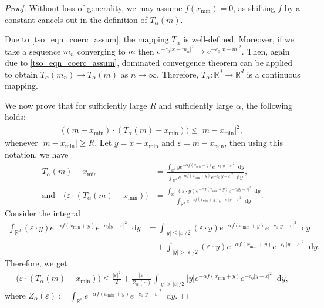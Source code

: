 \documentclass[10pt,a4paper]{amsart}
\newcommand*\der{\mathop{}\!\mathrm{d}}
\begin{document}
\begin{proof}
Without loss of generality, we may assume $f(x_{\min}) = 0$, as shifting $f$ by a constant cancels out in the definition of $T_\alpha(m)$.

Due to \eqref{tso_eqn_coerc_assum}, the mapping $T_\alpha$ is well-defined. Moreover, if we take a sequence $m_n $ converging to $m$ then $e^{-c_0 |x - m_n|^2} \to e^{-c_0 |x - m|^2}$. Then, again due to  \eqref{tso_eqn_coerc_assum}, dominated convergence theorem can be applied to obtain $T_\alpha (m_n) \to T_{\alpha}(m) $ as $n \to \infty$. Therefore, $T_\alpha :\mathbb{R}^{d} \to \mathbb{R}^d$ is a continuous mapping. 


We now prove that for sufficiently large $R$ and sufficiently large $\alpha$, the following holds:
\begin{align*}
 \big( ( m - x_{\min}) \cdot (T_\alpha(m) - x_{\min})\big) \leq |m - x_{\min}|^2, 
\end{align*}
whenever $|m - x_{\min}| \geq R$. Let $y = x - x_{\min}$ and $\varepsilon = m - x_{\min}$, then using this notation, we have
\begin{align*}
    T_{\alpha}(m) - x_{\min} &= \frac{\int_{\mathbb{R}^d} y e^{-\alpha f(x_{\min} + y)} e^{-c_0 |y - \varepsilon|^2} \der y}{\int_{\mathbb{R}^d} e^{-\alpha f(x_{\min} + y)} e^{-c_0 |y - \varepsilon|^2} \der y}, \\ 
   \text{and}\quad  \big( \varepsilon \cdot (T_{\alpha}(m) - x_{\min})\big) &= \frac{\int_{\mathbb{R}^d} (\varepsilon \cdot y) e^{-\alpha f(x_{\min} + y)} e^{-c_0 |y - \varepsilon|^2} \der y}{\int_{\mathbb{R}^d} e^{-\alpha f(x_{\min} + y)} e^{-c_0 |y - \varepsilon|^2} \der y}.
\end{align*}
Consider the integral 
\begin{align*}
    \int_{\mathbb{R}^d} (\varepsilon \cdot y) e^{-\alpha f(x_{\min} + y)} e^{-c_0 |y - \varepsilon|^2} \der y & = \int_{|y| \leq |\varepsilon|/2 } (\varepsilon \cdot y) e^{-\alpha f(x_{\min} + y)} e^{-c_0 |y - \varepsilon|^2} \der y \nonumber 
    \\   &   \quad + \int_{|y| > |\varepsilon|/2 } (\varepsilon \cdot y) e^{-\alpha f(x_{\min} + y)} e^{-c_0 |y - \varepsilon|^2} \der y.
\end{align*}
Therefore, we get
\begin{align}\label{tso_eqn_2.7}
     \big( \varepsilon \cdot (T_{\alpha}(m) - x_{\min})\big) \leq  \frac{|\varepsilon|^2}{2 } + \frac{|\varepsilon|}{Z_\alpha(\varepsilon)} \int_{|y| > |\varepsilon|/2 }  |y| e^{-\alpha f(x_{\min} + y)} e^{-c_0 |y - \varepsilon|^2} \der y,
\end{align}
where $Z_\alpha(\varepsilon) := \int_{\mathbb{R}^d} e^{-\alpha f(x_{\min} + y)} e^{-c_0 |y - \varepsilon|^2} \der y $. 



\end{proof}
\end{document}
